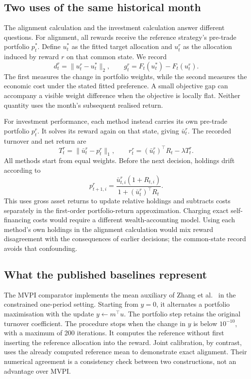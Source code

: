 \documentclass[sigconf,review]{acmart}
\begin{document}
\subsection{Two uses of the same historical month}
The alignment calculation and the investment calculation answer different questions. For alignment, all rewards receive the reference strategy's pre-trade portfolio $p_t^*$. Define $u_t^*$ as the fitted target allocation and $u_t^r$ as the allocation induced by reward $r$ on that common state. We record
\begin{equation}
 d_t^r=\|u_t^r-u_t^*\|_2,\qquad
 g_t^r=F_t(u_t^*)-F_t(u_t^r).
\end{equation}
The first measures the change in portfolio weights, while the second measures the economic cost under the stated fitted preference. A small objective gap can accompany a visible weight difference when the objective is locally flat. Neither quantity uses the month's subsequent realised return.

For investment performance, each method instead carries its own pre-trade portfolio $p_t^r$. It solves its reward again on that state, giving $\bar u_t^r$. The recorded turnover and net return are
\begin{equation}
 T_t^r=\|\bar u_t^r-p_t^r\|_1,\qquad
 r_t^r=(\bar u_t^r)^\top R_t-\lambda T_t^r.
\end{equation}
All methods start from equal weights. Before the next decision, holdings drift according to
\begin{equation}
 p_{t+1,i}^r=
 \frac{\bar u_{t,i}^r(1+R_{t,i})}{1+(\bar u_t^r)^\top R_t}.
\end{equation}
This uses gross asset returns to update relative holdings and subtracts costs separately in the first-order portfolio-return approximation. Charging exact self-financing costs would require a different wealth-accounting model. Using each method's own holdings in the alignment calculation would mix reward disagreement with the consequences of earlier decisions; the common-state record avoids that confounding.

\subsection{What the published baselines represent}
The MVPI comparator implements the mean auxiliary of Zhang et al.\ \cite{zhang2021} in the constrained one-period setting. Starting from $y=0$, it alternates a portfolio maximisation with the update $y\leftarrow m^\top u$. The portfolio step retains the original turnover coefficient. The procedure stops when the change in $y$ is below $10^{-10}$, with a maximum of 200 iterations. It computes the reference without first inserting the reference allocation into the reward. Joint calibration, by contrast, uses the already computed reference mean to demonstrate exact alignment. Their numerical agreement is a consistency check between two constructions, not an advantage over MVPI.
\end{document}
